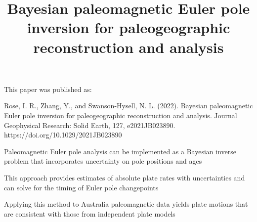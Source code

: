 \documentclass[]{agujournal2019}
\begin{document}
\title{Bayesian paleomagnetic Euler pole inversion for paleogeographic reconstruction and analysis}





\vspace{0.5 in}
\noindent This paper was published as:

\noindent Rose, I. R., Zhang, Y., and Swanson-Hysell, N. L. (2022). Bayesian paleomagnetic Euler pole inversion for paleogeographic reconstruction and analysis. Journal  Geophysical Research: Solid Earth, 127, e2021JB023890. https://doi.org/10.1029/2021JB023890

\begin{keypoints}
\item Paleomagnetic Euler pole analysis can be implemented as a Bayesian inverse problem that incorporates uncertainty on pole positions and ages
\item This approach provides estimates of absolute plate rates with uncertainties and can solve for the timing of Euler pole changepoints
\item Applying this method to Australia paleomagnetic data yields plate motions that are consistent with those from independent plate models
\end{keypoints}
\end{document}
